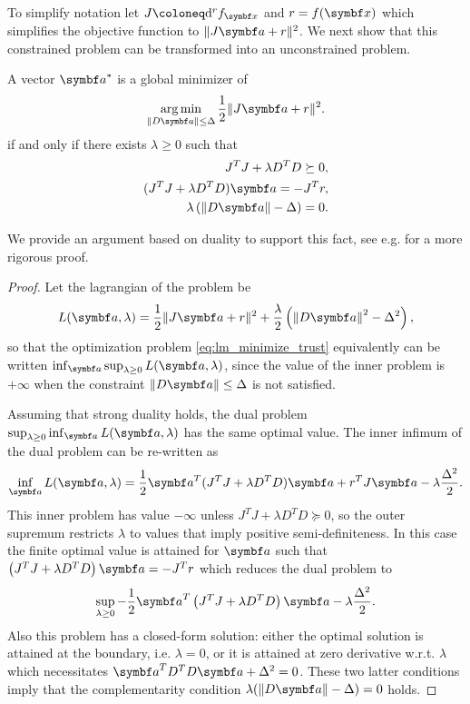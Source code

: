 To simplify notation let $J \coloneq \mathrm{d}^r f_\x$ and $r = f(\x)$ which simplifies the objective function to $\| J \a + r \|^2$. We next show that this constrained problem can be transformed into an unconstrained problem.
\begin{theorem}
  \label{thm:lm}
  A vector $\a^*$ is a global minimizer of
  \begin{equation}
    \argmin_{\| D \a \| \leq \Delta} \frac{1}{2} \| J \a + r \|^2.
  \end{equation}
  if and only if there exists $\lambda \geq 0$ such that
  \begin{subequations}
    \begin{align}
      J^T J + \lambda D^T D \succeq 0,                              \\
      (J^T J + \lambda D^T D) \a = -J^T r,  \label{eq:lm_normaleqs} \\
      \lambda \left( \left\| D \a \right\| - \Delta \right)=0.
    \end{align}
  \end{subequations}
\end{theorem}
We provide an argument based on duality to support this fact, see e.g. \cite[Theorem 4.1]{nocedal_numerical_2006} for a more rigorous proof.
\begin{proof}
  Let the lagrangian of the problem be
  \begin{equation}
    L(\a, \lambda) = \frac{1}{2} \| J \a + r \|^2 + \frac{\lambda}{2} \left( \left\| D \a \right\|^2 - \Delta^2 \right),
  \end{equation}
  so that the optimization problem \eqref{eq:lm_minimize_trust} equivalently can be written $\inf_{\a} \sup_{\lambda \geq 0} L(\a, \lambda)$, since the value of the inner problem is $+\infty$ when the constraint $\| D \a \| \leq \Delta$ is not satisfied.

  Assuming that strong duality holds, the dual problem $\sup_{\lambda \geq 0} \inf_{\a} L(\a, \lambda)$ has the same optimal value. The inner infimum of the dual problem can be re-written as
  \begin{equation}
    \inf_{\a} L(\a, \lambda) = \frac{1}{2} \a^T ( J^T J + \lambda D^T D ) \a + r^T J \a - \lambda \frac{\Delta^2}{2}.
  \end{equation}
  This inner problem has value $-\infty$ unless $J^T J + \lambda D^T D \succeq 0$, so the outer supremum restricts $\lambda$ to values that imply positive semi-definiteness. In this case the finite optimal value is attained for $\a$ such that $\left(J^T J + \lambda D^T D \right) \a = -J^T r$ which reduces the dual problem to
  \begin{equation}
    \sup_{\lambda \geq 0} -\frac{1}{2} \a^T \left( J^T J + \lambda D^T D \right) \a - \lambda \frac{\Delta^2}{2}.
  \end{equation}
  Also this problem has a closed-form solution: either the optimal solution is attained at the boundary, i.e. $\lambda = 0$, or it is attained at zero derivative w.r.t. $\lambda$ which necessitates $\a^T D^T D \a + \Delta^2 = 0$. These two latter conditions imply that the complementarity condition $\lambda (\| D \a \| - \Delta) = 0$ holds.
\end{proof}

